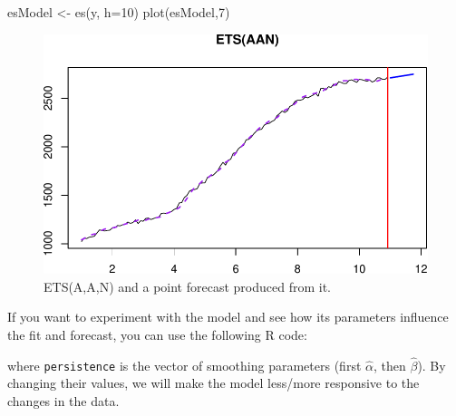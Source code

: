 \documentclass[
]{book}
\newenvironment{Shaded}{\begin{snugshade}}{\end{snugshade}}
\newcommand{\AttributeTok}[1]{\textcolor[rgb]{0.77,0.63,0.00}{#1}}
\newcommand{\DecValTok}[1]{\textcolor[rgb]{0.00,0.00,0.81}{#1}}
\newcommand{\FloatTok}[1]{\textcolor[rgb]{0.00,0.00,0.81}{#1}}
\newcommand{\FunctionTok}[1]{\textcolor[rgb]{0.00,0.00,0.00}{#1}}
\newcommand{\NormalTok}[1]{#1}
\newcommand{\OtherTok}[1]{\textcolor[rgb]{0.56,0.35,0.01}{#1}}
\newcommand{\SpecialCharTok}[1]{\textcolor[rgb]{0.00,0.00,0.00}{#1}}
\theoremstyle{definition}
\theoremstyle{definition}
\theoremstyle{definition}
\theoremstyle{definition}
\theoremstyle{remark}
\begin{document}
\begin{Shaded}
\begin{Highlighting}[]
\NormalTok{esModel }\OtherTok{\textless{}{-}} \FunctionTok{es}\NormalTok{(y, }\AttributeTok{h=}\DecValTok{10}\NormalTok{)}
\FunctionTok{plot}\NormalTok{(esModel,}\DecValTok{7}\NormalTok{)}
\end{Highlighting}
\end{Shaded}

\begin{figure}
\centering
\includegraphics{Svetunkov--2022----ADAM_files/figure-latex/ETSAANExampleForecast-1.pdf}
\caption{\label{fig:ETSAANExampleForecast}ETS(A,A,N) and a point forecast produced from it.}
\end{figure}

If you want to experiment with the model and see how its parameters influence the fit and forecast, you can use the following R code:

\begin{Shaded}
\end{Shaded}

where \texttt{persistence} is the vector of smoothing parameters (first \(\hat\alpha\), then \(\hat\beta\)). By changing their values, we will make the model less/more responsive to the changes in the data.
\end{document}
